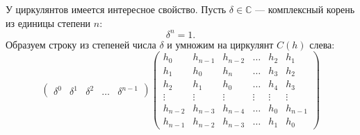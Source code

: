 У циркулянтов имеется интересное свойство. Пусть $\delta \in \mathbb{C}$ --- комплексный корень из единицы степени $n$:
\[
    \delta^n = 1 .
\]
Образуем строку из степеней числа $\delta$ и умножим на циркулянт $C(h)$ слева:
\[
    \begin{pmatrix}
        \delta^0 & \delta^1 & \delta^2 & \dots & \delta^{n-1}
    \end{pmatrix}
    \begin{pmatrix}
        h_0     & h_{n-1} & h_{n-2} & \dots  & h_2    & h_1     \\
        h_1     & h_0     & h_{n}   & \dots  & h_3    & h_2     \\
        h_2     & h_1     & h_{0}   & \dots  & h_4    & h_3     \\
        \vdots  & \vdots  & \vdots  & \vdots & \vdots & \vdots  \\
        h_{n-2} & h_{n-3} & h_{n-4} & \dots  & h_0    & h_{n-1} \\
        h_{n-1} & h_{n-2} & h_{n-3} & \dots  & h_1    & h_0
    \end{pmatrix}
\]

